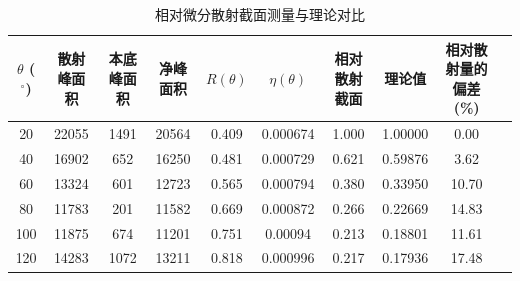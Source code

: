 \documentclass[font=default]{mpltx}
\begin{document}
      \begin{table}[htbp]
        \centering
        \caption{相对微分散射截面测量与理论对比}
        \begin{tabular}{cccccccccc}
          \toprule
          $\theta$ ($^\circ$) & 散射峰面积 & 本底峰面积 & 净峰面积 & $R(\theta)$ & $\eta(\theta)$ & 相对散射截面 & 理论值 & 相对散射量的偏差 (\%) \\
          \midrule
          20 & 22055 & 1491 & 20564 & 0.409 & 0.000674 & 1.000 & 1.00000 & 0.00 \\
          40 & 16902 & 652 & 16250 & 0.481 & 0.000729 & 0.621 & 0.59876 & 3.62 \\
          60 & 13324 & 601 & 12723 & 0.565 & 0.000794 & 0.380 & 0.33950 & 10.70 \\
          80 & 11783 & 201 & 11582 & 0.669 & 0.000872 & 0.266 & 0.22669 & 14.83 \\
          100 & 11875 & 674 & 11201 & 0.751 & 0.00094 & 0.213 & 0.18801 & 11.61 \\
          120 & 14283 & 1072 & 13211 & 0.818 & 0.000996 & 0.217 & 0.17936 & 17.48 \\
          \bottomrule
        \end{tabular}
        \label{tab:scattering_cross_section}
      \end{table}
\end{document}
